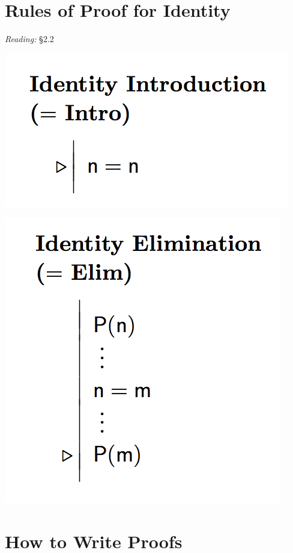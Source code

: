 \documentclass[12pt]{extarticle}
\begin{document}
\begin{multicols*}{3}
 
\section{Rules of Proof for Identity}
 
\emph{Reading:} §2.2
 
\begin{center}
\includegraphics[scale=0.3]{img/rule_identity_intro.png}
\end{center}
\begin{center}
\includegraphics[scale=0.3]{img/rule_identity_elim.png}
\end{center}
 
 
\section{How to Write Proofs}
 

\end{multicols*}
\end{document}
